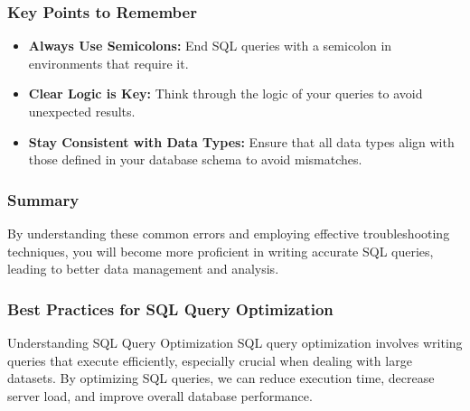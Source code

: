 \documentclass[aspectratio=169]{beamer}
\begin{document}
\begin{frame}[fragile]
    \frametitle{Key Points to Remember}
    \begin{itemize}
        \item \textbf{Always Use Semicolons:} End SQL queries with a semicolon in environments that require it.
        \item \textbf{Clear Logic is Key:} Think through the logic of your queries to avoid unexpected results.
        \item \textbf{Stay Consistent with Data Types:} Ensure that all data types align with those defined in your database schema to avoid mismatches.
    \end{itemize}
\end{frame}

\begin{frame}[fragile]
    \frametitle{Summary}
    By understanding these common errors and employing effective troubleshooting techniques, you will become more proficient in writing accurate SQL queries, leading to better data management and analysis.
\end{frame}

\begin{frame}[fragile]
    \frametitle{Best Practices for SQL Query Optimization}
    \begin{block}{Understanding SQL Query Optimization}
        SQL query optimization involves writing queries that execute efficiently, especially crucial when dealing with large datasets. By optimizing SQL queries, we can reduce execution time, decrease server load, and improve overall database performance.
    \end{block}
\end{frame}
\end{document}
